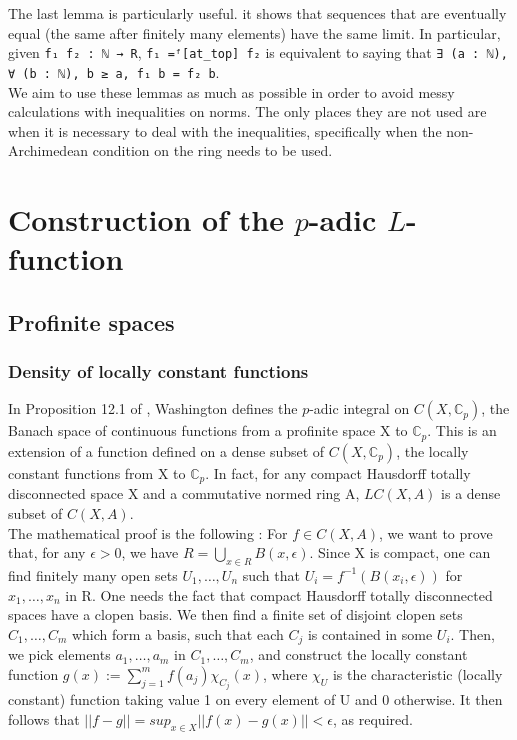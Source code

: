 \documentclass[11pt]{article}
\newcommand{\lean}[1]{\texttt{#1}\xspace} %
\begin{document}
The last lemma is particularly useful. it shows that sequences that are eventually equal (the same after finitely many 
elements) have the same limit. In particular, given \lean{f₁ f₂ : ℕ → R}, \lean{f₁ =ᶠ[at\_top] f₂} is equivalent to saying that 
\lean{∃ (a : ℕ), ∀ (b : ℕ), b ≥ a, f₁ b = f₂ b}. \\

We aim to use these lemmas as much as possible in order to avoid messy calculations with inequalities on norms. The only places they are 
not used are when it is necessary to deal with the inequalities, specifically when the non-Archimedean condition on the ring needs to be used.

\section{Construction of the $p$-adic $L$-function}
\subsection{Profinite spaces}
\subsubsection{Density of locally constant functions}
In Proposition 12.1 of \cite{cyc}, Washington defines the $p$-adic integral on $C(X, \mathbb{C}_p)$,
the Banach space of continuous functions from a profinite space X to $\mathbb{C}_p$.
This is an extension of a function defined on a dense subset of $C(X, \mathbb{C}_p)$, the
locally constant functions from X to $\mathbb{C}_p$. In fact, for any compact
Hausdorff totally disconnected space X and a commutative
normed ring A, $LC(X, A)$ is a dense subset of $C(X, A)$. \\

The mathematical proof is the following : For $f \in C(X, A)$, we want to prove that,
for any $\epsilon > 0$, we have $R = \bigcup_{x \in R} B(x, \epsilon)$. Since X is compact,
one can find finitely many open sets $U_1, \dots, U_n$ such that $U_i = f^{-1}(B(x_i, \epsilon))$
for $x_1, \dots, x_n$ in R. One needs the fact that compact Hausdorff totally disconnected spaces
have a clopen basis. We then find a finite set of disjoint clopen sets $C_1, \dots, C_m$ which form
a basis, such that each $C_j$ is contained in some $U_i$.
Then, we pick elements $a_1, \dots, a_m$ in $C_1, \dots, C_m$, and construct the locally constant
function $g(x) := \sum_{j = 1}^m f(a_j) \chi_{C_j}(x)$, where $\chi_U$ is the characteristic
(locally constant) function taking value 1 on every element of U and 0 otherwise. It then follows
that $|| f - g || = sup_{x \in X} ||f(x) - g(x)|| < \epsilon$, as required. \\
\end{document}

